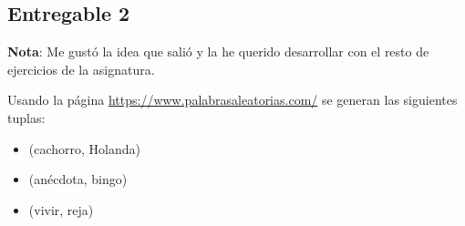 




\subsection{Entregable 2}


\textbf{Nota}: Me gustó la idea que salió y la he querido desarrollar con el resto de ejercicios de la asignatura.

\vspace{\baselineskip}

Usando la página \url{https://www.palabrasaleatorias.com/} se generan las siguientes tuplas:
\begin{itemize}
    \item (cachorro, Holanda)
    \item (anécdota, bingo)
    \item (vivir, reja)
\end{itemize}

